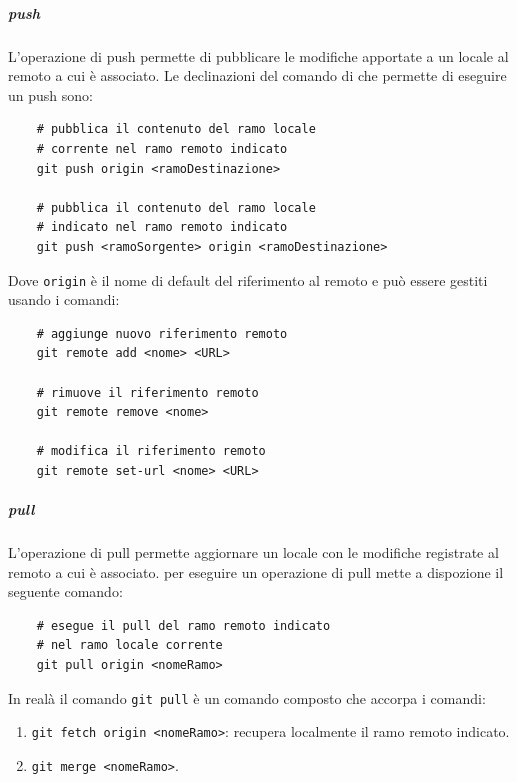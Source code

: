 \subparagraph{push}
\label{subpar:push}
L'operazione di push permette di pubblicare le modifiche apportate a un  locale al  remoto a cui è associato.
Le declinazioni del comando di  che permette di eseguire un push sono:
\begin{lstlisting}
    # pubblica il contenuto del ramo locale 
    # corrente nel ramo remoto indicato
    git push origin <ramoDestinazione> 

    # pubblica il contenuto del ramo locale
    # indicato nel ramo remoto indicato
    git push <ramoSorgente> origin <ramoDestinazione>
\end{lstlisting}   
Dove \texttt{origin} è il nome di default del riferimento al  remoto e può essere gestiti usando i comandi:
\begin{lstlisting}
    # aggiunge nuovo riferimento remoto
    git remote add <nome> <URL>

    # rimuove il riferimento remoto
    git remote remove <nome>

    # modifica il riferimento remoto
    git remote set-url <nome> <URL>
\end{lstlisting}

\subparagraph{pull}
\label{subpar:pull}
L'operazione di pull permette aggiornare un  locale con le modifiche registrate al  remoto a cui è associato.
 per eseguire un operazione di pull mette a dispozione il seguente comando:
\begin{lstlisting}
    # esegue il pull del ramo remoto indicato
    # nel ramo locale corrente
    git pull origin <nomeRamo>
\end{lstlisting}
In realà il comando \lstinline|git pull| è un comando composto che accorpa i comandi:
\begin{enumerate}
    \item \lstinline|git fetch origin <nomeRamo>|: recupera localmente il ramo remoto indicato.
    \item \lstinline|git merge <nomeRamo>|.
\end{enumerate}

